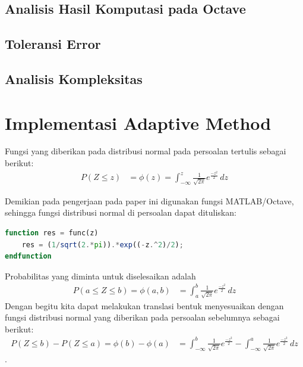 \documentclass[journal,12pt,onecolumn,a4paper]{IEEEtran}
\begin{document}
\subsection{Analisis Hasil Komputasi pada Octave}

\subsection{Toleransi Error}

\subsection{Analisis Kompleksitas}

\section{Implementasi Adaptive Method}
\par Fungsi yang diberikan pada distribusi normal pada persoalan tertulis sebagai berikut:
\begin{equation*}
	\begin{split}
		P(Z \le z ) & = \phi(z) = \int_{-\infty}^{z} \frac{1}{\sqrt{2\pi}}e ^{\frac{-z^2}{2}} \,dz
	\end{split}
\end{equation*}

\par Demikian pada pengerjaan pada paper ini digunakan fungsi MATLAB/Octave, sehingga fungsi distribusi normal di persoalan dapat dituliskan:
\begin{center}
	\begin{lstlisting}[language=Octave]
function res = func(z)
	res = (1/sqrt(2.*pi)).*exp((-z.^2)/2);
endfunction
	\end{lstlisting}
\end{center}

Probabilitas yang diminta untuk diselesaikan adalah
\begin{equation*}
	\begin{split}
		P(a \le Z \le b )  = \phi(a,b) & = \int_{a}^{b} \frac{1}{\sqrt{2\pi}}e ^{\frac{-z^2}{2}} \,dz
	\end{split}
\end{equation*}
Dengan begitu kita dapat melakukan translasi bentuk menyesuaikan dengan fungsi distribusi normal yang diberikan pada persoalan sebelumnya sebagai berikut:
\begin{equation*}
	\begin{split}
		P(Z \le b ) - P(Z \le a )  = \phi(b)-\phi(a) & =  \int_{-\infty}^{b} \frac{1}{\sqrt{2\pi}}e ^{\frac{-z^2}{2}} - \int_{-\infty}^{a} \frac{1}{\sqrt{2\pi}}e ^{\frac{-z^2}{2}} \,dz
	\end{split}
\end{equation*}.
\end{document}
